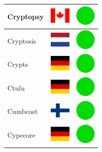 \documentclass[12pt, a4paper, twoside]{report}
\begin{document}
\begin{center}
\begin{longtable}{|p{5cm}|p{2cm}|p{2cm}|}
Cryptopsy & \includegraphics[width=1cm]{4x3/ca} & \includegraphics[width=1cm]{likes/y} \\ \hline
Cryptosis & \includegraphics[width=1cm]{4x3/nl} & \includegraphics[width=1cm]{likes/y} \\ \hline
Crypts & \includegraphics[width=1cm]{4x3/de} & \includegraphics[width=1cm]{likes/y} \\ \hline
Ctulu & \includegraphics[width=1cm]{4x3/de} & \includegraphics[width=1cm]{likes/y} \\ \hline
Cumbeast & \includegraphics[width=1cm]{4x3/fi} & \includegraphics[width=1cm]{likes/y} \\ \hline
Cypecore & \includegraphics[width=1cm]{4x3/de} & \includegraphics[width=1cm]{likes/y} \\ \hline

\end{longtable}
\end{center}
\end{document}

